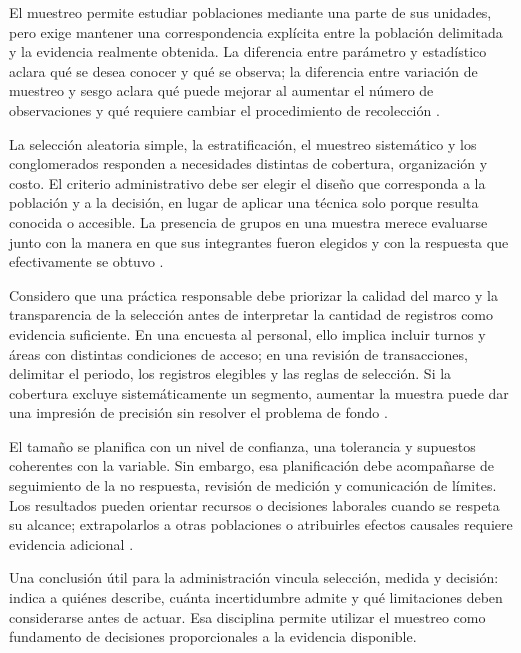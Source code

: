 El muestreo permite estudiar poblaciones mediante una parte de sus unidades, pero exige mantener una correspondencia explícita entre la población delimitada y la evidencia realmente obtenida. La diferencia entre parámetro y estadístico aclara qué se desea conocer y qué se observa; la diferencia entre variación de muestreo y sesgo aclara qué puede mejorar al aumentar el número de observaciones y qué requiere cambiar el procedimiento de recolección \citep{wackerly2010,bradley2021}.

La selección aleatoria simple, la estratificación, el muestreo sistemático y los conglomerados responden a necesidades distintas de cobertura, organización y costo. El criterio administrativo debe ser elegir el diseño que corresponda a la población y a la decisión, en lugar de aplicar una técnica solo porque resulta conocida o accesible. La presencia de grupos en una muestra merece evaluarse junto con la manera en que sus integrantes fueron elegidos y con la respuesta que efectivamente se obtuvo \citep{holmesBusiness2023}.

Considero que una práctica responsable debe priorizar la calidad del marco y la transparencia de la selección antes de interpretar la cantidad de registros como evidencia suficiente. En una encuesta al personal, ello implica incluir turnos y áreas con distintas condiciones de acceso; en una revisión de transacciones, delimitar el periodo, los registros elegibles y las reglas de selección. Si la cobertura excluye sistemáticamente un segmento, aumentar la muestra puede dar una impresión de precisión sin resolver el problema de fondo \citep{bradley2021}.

El tamaño se planifica con un nivel de confianza, una tolerancia y supuestos coherentes con la variable. Sin embargo, esa planificación debe acompañarse de seguimiento de la no respuesta, revisión de medición y comunicación de límites. Los resultados pueden orientar recursos o decisiones laborales cuando se respeta su alcance; extrapolarlos a otras poblaciones o atribuirles efectos causales requiere evidencia adicional \citep{bloom2024}.

Una conclusión útil para la administración vincula selección, medida y decisión: indica a quiénes describe, cuánta incertidumbre admite y qué limitaciones deben considerarse antes de actuar. Esa disciplina permite utilizar el muestreo como fundamento de decisiones proporcionales a la evidencia disponible.

